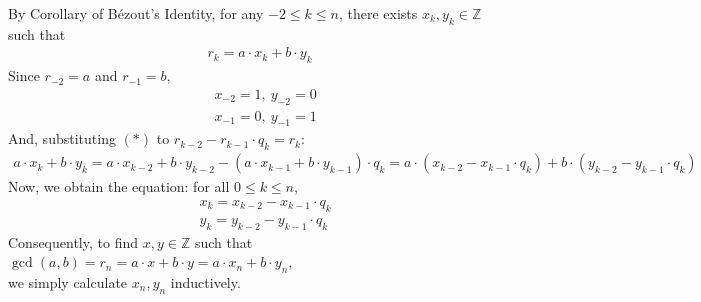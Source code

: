 By Corollary of Bézout’s Identity, for any $-2 \leq k \leq n$, there exists $x_k, y_k \in \mathbb{Z}$ such that
\begin{align*}
    r_k = a \cdot x_k + b \cdot y_k \tag{$*$}
\end{align*}
Since $r_{-2} = a$ and $r_{-1} = b$,
\begin{align*}
    &x_{-2} = 1,\ y_{-2} = 0 \\
    &x_{-1} = 0,\ y_{-1} = 1
\end{align*}
And, substituting $(*)$ to $r_{k-2} - r_{k-1} \cdot q_k = r_k$:
\begin{align*}
    a \cdot x_{k} + b \cdot y_{k}
    = a \cdot x_{k-2} + b \cdot y_{k-2} - (a \cdot x_{k-1} + b \cdot y_{k-1}) \cdot q_{k}
    = a \cdot (x_{k-2} - x_{k-1} \cdot q_k) + b \cdot (y_{k-2} - y_{k-1} \cdot q_k)
\end{align*}
Now, we obtain the equation: for all $0 \leq k \leq n$,
\begin{align*}
    &x_k = x_{k-2} - x_{k-1} \cdot q_k \\
    &y_k = y_{k-2} - y_{k-1} \cdot q_k
\end{align*}
Consequently, to find $x,y \in \mathbb{Z}$ such that $\gcd(a,b) = r_n = a \cdot x + b \cdot y = a \cdot x_n + b \cdot y_n$, \\
we simply calculate $x_n, y_n$ inductively.

